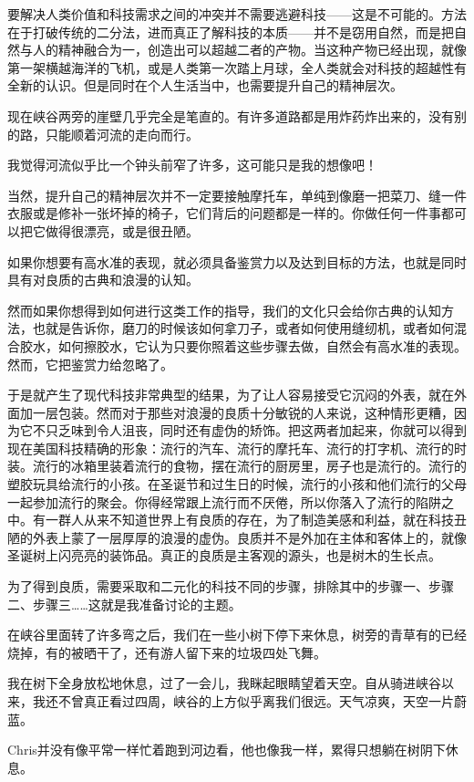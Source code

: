 \documentclass[UTF8]{article}
\begin{document}
\par 要解决人类价值和科技需求之间的冲突并不需要逃避科技——这是不可能的。方法在于打破传统的二分法，进而真正了解科技的本质——并不是窃用自然，而是把自然与人的精神融合为一，创造出可以超越二者的产物。当这种产物已经出现，就像第一架横越海洋的飞机，或是人类第一次踏上月球，全人类就会对科技的超越性有全新的认识。但是同时在个人生活当中，也需要提升自己的精神层次。
\par 现在峡谷两旁的崖壁几乎完全是笔直的。有许多道路都是用炸药炸出来的，没有别的路，只能顺着河流的走向而行。
\par 我觉得河流似乎比一个钟头前窄了许多，这可能只是我的想像吧！
\par 当然，提升自己的精神层次并不一定要接触摩托车，单纯到像磨一把菜刀、缝一件衣服或是修补一张坏掉的椅子，它们背后的问题都是一样的。你做任何一件事都可以把它做得很漂亮，或是很丑陋。
\par 如果你想要有高水准的表现，就必须具备鉴赏力以及达到目标的方法，也就是同时具有对良质的古典和浪漫的认知。
\par 然而如果你想得到如何进行这类工作的指导，我们的文化只会给你古典的认知方法，也就是告诉你，磨刀的时候该如何拿刀子，或者如何使用缝纫机，或者如何混合胶水，如何擦胶水，它认为只要你照着这些步骤去做，自然会有高水准的表现。然而，它把鉴赏力给忽略了。
\par 于是就产生了现代科技非常典型的结果，为了让人容易接受它沉闷的外表，就在外面加一层包装。然而对于那些对浪漫的良质十分敏锐的人来说，这种情形更糟，因为它不只乏味到令人沮丧，同时还有虚伪的矫饰。把这两者加起来，你就可以得到现在美国科技精确的形象：流行的汽车、流行的摩托车、流行的打字机、流行的时装。流行的冰箱里装着流行的食物，摆在流行的厨房里，房子也是流行的。流行的塑胶玩具给流行的小孩。在圣诞节和过生日的时候，流行的小孩和他们流行的父母一起参加流行的聚会。你得经常跟上流行而不厌倦，所以你落入了流行的陷阱之中。有一群人从来不知道世界上有良质的存在，为了制造美感和利益，就在科技丑陋的外表上蒙了一层厚厚的浪漫的虚伪。良质并不是外加在主体和客体上的，就像圣诞树上闪亮亮的装饰品。真正的良质是主客观的源头，也是树木的生长点。
\par 为了得到良质，需要采取和二元化的科技不同的步骤，排除其中的步骤一、步骤二、步骤三……这就是我准备讨论的主题。
\par 在峡谷里面转了许多弯之后，我们在一些小树下停下来休息，树旁的青草有的已经烧掉，有的被晒干了，还有游人留下来的垃圾四处飞舞。
\par 我在树下全身放松地休息，过了一会儿，我眯起眼睛望着天空。自从骑进峡谷以来，我还不曾真正看过四周，峡谷的上方似乎离我们很远。天气凉爽，天空一片蔚蓝。
\par Chris并没有像平常一样忙着跑到河边看，他也像我一样，累得只想躺在树阴下休息。
\end{document}
